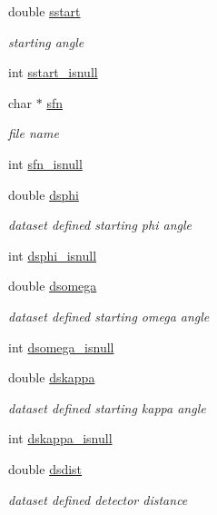 \begin{DoxyCompactItemize}
\item 
double \hyperlink{structlspg__nextshot__struct_a8dc11eaa094d59f61642c4abc226918f}{sstart}
\begin{DoxyCompactList}\small\item\em starting angle \end{DoxyCompactList}\item 
int \hyperlink{structlspg__nextshot__struct_aa53094de91e2f69d7174ab119df1cdac}{sstart\-\_\-isnull}
\item 
char $\ast$ \hyperlink{structlspg__nextshot__struct_a03252bba597b081edc9d08b20b558cc7}{sfn}
\begin{DoxyCompactList}\small\item\em file name \end{DoxyCompactList}\item 
int \hyperlink{structlspg__nextshot__struct_a56f32eb413b1fca9f085874eb86294de}{sfn\-\_\-isnull}
\item 
double \hyperlink{structlspg__nextshot__struct_a64ebde597ca97a3b98145dc2d580c64f}{dsphi}
\begin{DoxyCompactList}\small\item\em dataset defined starting phi angle \end{DoxyCompactList}\item 
int \hyperlink{structlspg__nextshot__struct_a2d1f51cb1bb575a214344773136be878}{dsphi\-\_\-isnull}
\item 
double \hyperlink{structlspg__nextshot__struct_a4be525bb32fb0232c21a91529f1e8c73}{dsomega}
\begin{DoxyCompactList}\small\item\em dataset defined starting omega angle \end{DoxyCompactList}\item 
int \hyperlink{structlspg__nextshot__struct_ad1da3548dc642d415aed53dc165c44fc}{dsomega\-\_\-isnull}
\item 
double \hyperlink{structlspg__nextshot__struct_a59355281e8eb935cd7bfac597fdc5289}{dskappa}
\begin{DoxyCompactList}\small\item\em dataset defined starting kappa angle \end{DoxyCompactList}\item 
int \hyperlink{structlspg__nextshot__struct_a1686a72509cc1c3383ee95a790ddff14}{dskappa\-\_\-isnull}
\item 
double \hyperlink{structlspg__nextshot__struct_acab9431a911f5bb11296cbfb271fb83a}{dsdist}
\begin{DoxyCompactList}\small\item\em dataset defined detector distance \end{DoxyCompactList}\item 

\end{DoxyCompactItemize}
